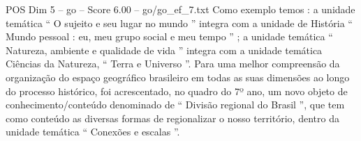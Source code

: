 \begin{textsample}{POS Dim 5 – go – Score 6.00 – go/go\_ef\_7.txt}
Como exemplo temos : a unidade temática “ O sujeito e seu lugar no mundo ” integra com a unidade de História “ Mundo pessoal : eu, meu grupo social e meu tempo ” ; a unidade temática “ Natureza, ambiente e qualidade de vida ” integra com a unidade temática Ciências da Natureza, “ Terra e Universo ”.
Para uma melhor compreensão da organização do espaço geográfico brasileiro em todas as suas dimensões ao longo do processo histórico, foi acrescentado, no quadro do 7º ano, um novo objeto de conhecimento/conteúdo denominado de “ Divisão regional do Brasil ”, que tem como conteúdo as diversas formas de regionalizar o nosso território, dentro da unidade temática “ Conexões e escalas ”.

\end{textsample}
